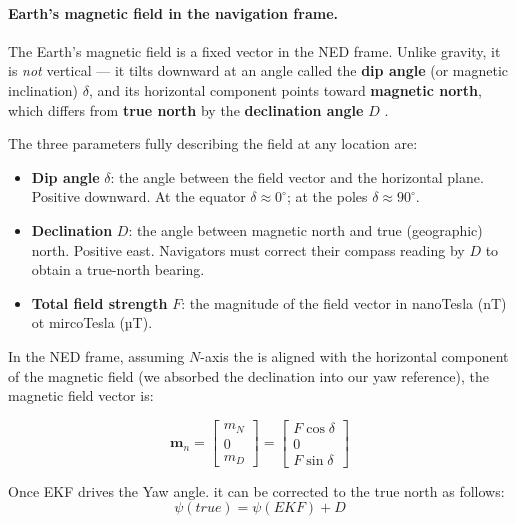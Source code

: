 \documentclass[12pt,a4paper]{article}
\begin{document}
\paragraph{Earth's magnetic field in the navigation frame.}

The Earth's magnetic field is a fixed vector in the NED frame. Unlike gravity,
it is \emph{not} vertical — it tilts downward at an angle called the
\textbf{dip angle} (or magnetic inclination) $\delta$, and its horizontal
component points toward \textbf{magnetic north}, which differs from
\textbf{true north} by the \textbf{declination angle} $D$
\citep{groves2013principles}.

The three parameters fully describing the field at any location are:

\begin{itemize}
  \item \textbf{Dip angle} $\delta$: the angle between the field vector and
        the horizontal plane. Positive downward. At the equator $\delta
        \approx 0^{\circ}$; at the poles $\delta \approx 90^{\circ}$.
  \item \textbf{Declination} $D$: the angle between magnetic north and true
        (geographic) north. Positive east. Navigators must correct their
        compass reading by $D$ to obtain a true-north bearing.
  \item \textbf{Total field strength} $F$: the magnitude of the field vector
        in nanoTesla (nT) ot mircoTesla (µT).
\end{itemize}

In the NED frame, assuming $N$-axis the is aligned with the
  horizontal component of the magnetic field (we absorbed the declination into our yaw reference), the
magnetic field vector is:

\begin{equation}
  \bm{m}_n =
  \begin{bmatrix}
    m_N \\ 0 \\ m_D
  \end{bmatrix}
  =
  \begin{bmatrix}
    F\cos\delta \\ 0 \\ F\sin\delta
  \end{bmatrix}
  \label{eq:mn_ned}
\end{equation}

Once EKF drives the Yaw angle. it can be corrected to the true north as follows:
\begin{equation}
    \psi(true) = \psi (EKF) + D  
  \label{eq:Declination_Correction}
\end{equation}
\end{document}
